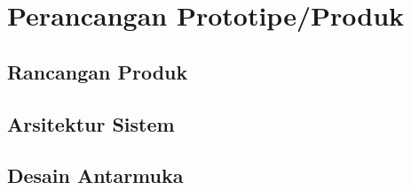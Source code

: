 \chapter{Perancangan Prototipe/Produk}

\section{Rancangan Produk}

\section{Arsitektur Sistem}

\section{Desain Antarmuka}
